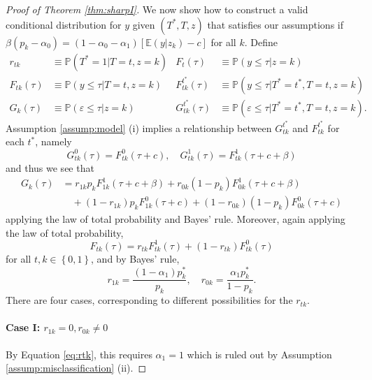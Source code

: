 \begin{proof}[Proof of Theorem \ref{thm:sharpI}]
We now show how to construct a valid conditional distribution for $y$ given $(T^*,T,z)$ that satisfies our assumptions if $\beta (p_k - \alpha_0) = (1 - \alpha_0 - \alpha_1)[\mathbb{E}(y|z_k) - c]$ for all $k$.
Define
\begin{align*}
r_{tk} &\equiv \mathbb{P}(T^*=1|T=t,z=k) &
F_{t}(\tau) &\equiv \mathbb{P}(y \leq \tau|z=k) \\
F_{tk}(\tau) &\equiv \mathbb{P}(y \leq \tau|T=t, z=k) & 
F_{tk}^{t^*}(\tau) &\equiv \mathbb{P}(y \leq \tau|T^*=t^*,T=t, z=k)\\
G_k(\tau) &\equiv \mathbb{P}(\varepsilon \leq \tau|z=k) &
G^{t^*}_{tk}(\tau) &\equiv \mathbb{P}(\varepsilon \leq \tau|T^*=t^*, T=t,z=k).
\end{align*}
Assumption \ref{assump:model} (i) implies a relationship between $G^{t^*}_{tk}$ and $F^{t^*}_{tk}$ for each $t^*$, namely 
\begin{equation}
  G^0_{tk}(\tau) = F^0_{tk}(\tau + c), \quad
  G^1_{tk}(\tau) = F^1_{tk}(\tau + c + \beta)
  \label{eq:Gtstartk}
\end{equation}
and thus we see that
\begin{align}
  G_k(\tau) &= r_{1k}p_k F^1_{1k}(\tau + c + \beta) + r_{0k}(1 - p_k) F^1_{0k}(\tau + c + \beta) \nonumber \\
  &\quad +  (1 - r_{1k})p_k F^0_{1k}(\tau + c) + (1 - r_{0k})(1 - p_k) F^0_{0k}(\tau + c)
  \label{eq:Gk}
\end{align}
applying the law of total probability and Bayes' rule.
Moreover, again applying the law of total probability, 
\begin{equation}
  F_{tk}(\tau) = r_{tk} F_{tk}^1(\tau) + (1 - r_{tk}) F_{tk}^0(\tau)
  \label{eq:Ftk}
\end{equation}
for all $t,k \in \left\{ 0,1 \right\}$, and by Bayes' rule,
\begin{equation}
  r_{1k} = \frac{(1 - \alpha_1)p_k^*}{p_k}, \quad
  r_{0k} = \frac{\alpha_1p_k^*}{1 - p_k}.
  \label{eq:rtk}
\end{equation}
There are four cases, corresponding to different possibilities for the  $r_{tk}$.

\paragraph{Case I: $r_{1k} = 0, r_{0k} \neq 0$}
By Equation \ref{eq:rtk}, this requires $\alpha_1 = 1$ which is ruled out by Assumption \ref{assump:misclassification} (ii).


\end{proof}
